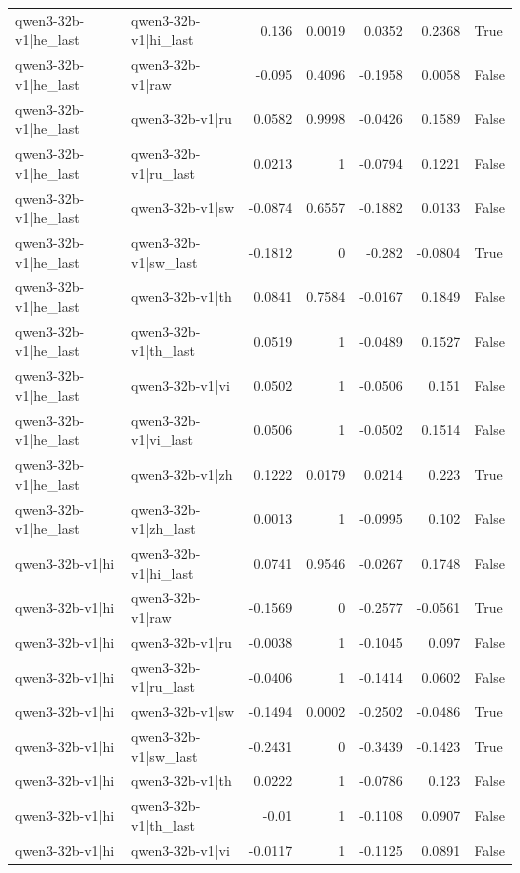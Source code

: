 \begin{table}
\begin{tabular}{l l r r r r l}
qwen3-32b-v1|he_last & qwen3-32b-v1|hi_last & 0.136 & 0.0019 & 0.0352 & 0.2368 & True \\
qwen3-32b-v1|he_last & qwen3-32b-v1|raw & -0.095 & 0.4096 & -0.1958 & 0.0058 & False \\
qwen3-32b-v1|he_last & qwen3-32b-v1|ru & 0.0582 & 0.9998 & -0.0426 & 0.1589 & False \\
qwen3-32b-v1|he_last & qwen3-32b-v1|ru_last & 0.0213 & 1 & -0.0794 & 0.1221 & False \\
qwen3-32b-v1|he_last & qwen3-32b-v1|sw & -0.0874 & 0.6557 & -0.1882 & 0.0133 & False \\
qwen3-32b-v1|he_last & qwen3-32b-v1|sw_last & -0.1812 & 0 & -0.282 & -0.0804 & True \\
qwen3-32b-v1|he_last & qwen3-32b-v1|th & 0.0841 & 0.7584 & -0.0167 & 0.1849 & False \\
qwen3-32b-v1|he_last & qwen3-32b-v1|th_last & 0.0519 & 1 & -0.0489 & 0.1527 & False \\
qwen3-32b-v1|he_last & qwen3-32b-v1|vi & 0.0502 & 1 & -0.0506 & 0.151 & False \\
qwen3-32b-v1|he_last & qwen3-32b-v1|vi_last & 0.0506 & 1 & -0.0502 & 0.1514 & False \\
qwen3-32b-v1|he_last & qwen3-32b-v1|zh & 0.1222 & 0.0179 & 0.0214 & 0.223 & True \\
qwen3-32b-v1|he_last & qwen3-32b-v1|zh_last & 0.0013 & 1 & -0.0995 & 0.102 & False \\
qwen3-32b-v1|hi & qwen3-32b-v1|hi_last & 0.0741 & 0.9546 & -0.0267 & 0.1748 & False \\
qwen3-32b-v1|hi & qwen3-32b-v1|raw & -0.1569 & 0 & -0.2577 & -0.0561 & True \\
qwen3-32b-v1|hi & qwen3-32b-v1|ru & -0.0038 & 1 & -0.1045 & 0.097 & False \\
qwen3-32b-v1|hi & qwen3-32b-v1|ru_last & -0.0406 & 1 & -0.1414 & 0.0602 & False \\
qwen3-32b-v1|hi & qwen3-32b-v1|sw & -0.1494 & 0.0002 & -0.2502 & -0.0486 & True \\
qwen3-32b-v1|hi & qwen3-32b-v1|sw_last & -0.2431 & 0 & -0.3439 & -0.1423 & True \\
qwen3-32b-v1|hi & qwen3-32b-v1|th & 0.0222 & 1 & -0.0786 & 0.123 & False \\
qwen3-32b-v1|hi & qwen3-32b-v1|th_last & -0.01 & 1 & -0.1108 & 0.0907 & False \\
qwen3-32b-v1|hi & qwen3-32b-v1|vi & -0.0117 & 1 & -0.1125 & 0.0891 & False \\

\end{tabular}
\end{table}
